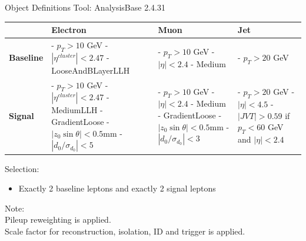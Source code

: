 \documentclass[mathserif,serif]{beamer}
\begin{document}
\begin{frame}{Object Definitions}
\small
Tool: AnalysisBase 2.4.31 \\

\centering
\begin{table}
\small
\begin{tabularx}{\textwidth}{p{1.5cm} | p{3cm} | p{3cm} | p{3cm}}
& \textbf{Electron} & \textbf{Muon} & \textbf{Jet}\\
\hline
\textbf{Baseline}
& - $p_T>10$ GeV \newline - $|\eta^{cluster}| < 2.47$ \newline - LooseAndBLayerLLH
& - $p_T>10$ GeV \newline - $|\eta| < 2.4$ \newline - Medium
& - $p_T>20$ GeV \\
\hline
\textbf{Signal}
& - $p_T > 10$ GeV \newline - $|\eta^{cluster}| < 2.47$ \newline - MediumLLH \newline - GradientLoose \newline - $|z_0 \sin \theta| < 0.5$mm \newline - $|d_0/\sigma_{d_0}| < 5$
& - $p_T > 10$ GeV \newline - $|\eta| < 2.4$ \newline - Medium \newline - GradientLoose \newline - $|z_0 \sin \theta| < 0.5$mm \newline - $|d_0/\sigma_{d_0}| < 3$
& - $p_T > 20$ GeV \newline - $|\eta|<4.5$ \newline \newline - $|JVT| > 0.59$ \newline if $p_T < 60$ GeV \newline and $|\eta| < 2.4$
\end{tabularx}
\end{table}

\raggedright
Selection:
\begin{itemize}
\item Exactly 2 baseline leptons and exactly 2 signal leptons
\end{itemize}

\tiny
Note: \\
Pileup reweighting is applied. \\
Scale factor for reconstruction, isolation, ID and trigger is applied.
\end{frame}
\end{document}
